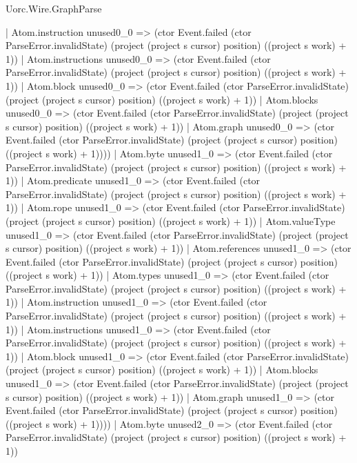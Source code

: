 \begin{lexlean}{Uorc.Wire.GraphParse}
\begin{semanticmodule}
{                  | Atom.instruction unused0_0 => (ctor Event.failed (ctor ParseError.invalidState) (project (project s cursor) position) ((project s work) + 1))
                  | Atom.instructions unused0_0 => (ctor Event.failed (ctor ParseError.invalidState) (project (project s cursor) position) ((project s work) + 1))
                  | Atom.block unused0_0 => (ctor Event.failed (ctor ParseError.invalidState) (project (project s cursor) position) ((project s work) + 1))
                  | Atom.blocks unused0_0 => (ctor Event.failed (ctor ParseError.invalidState) (project (project s cursor) position) ((project s work) + 1))
                  | Atom.graph unused0_0 => (ctor Event.failed (ctor ParseError.invalidState) (project (project s cursor) position) ((project s work) + 1))))
              | Atom.byte unused1_0 => (ctor Event.failed (ctor ParseError.invalidState) (project (project s cursor) position) ((project s work) + 1))
              | Atom.predicate unused1_0 => (ctor Event.failed (ctor ParseError.invalidState) (project (project s cursor) position) ((project s work) + 1))
              | Atom.rope unused1_0 => (ctor Event.failed (ctor ParseError.invalidState) (project (project s cursor) position) ((project s work) + 1))
              | Atom.valueType unused1_0 => (ctor Event.failed (ctor ParseError.invalidState) (project (project s cursor) position) ((project s work) + 1))
              | Atom.references unused1_0 => (ctor Event.failed (ctor ParseError.invalidState) (project (project s cursor) position) ((project s work) + 1))
              | Atom.types unused1_0 => (ctor Event.failed (ctor ParseError.invalidState) (project (project s cursor) position) ((project s work) + 1))
              | Atom.instruction unused1_0 => (ctor Event.failed (ctor ParseError.invalidState) (project (project s cursor) position) ((project s work) + 1))
              | Atom.instructions unused1_0 => (ctor Event.failed (ctor ParseError.invalidState) (project (project s cursor) position) ((project s work) + 1))
              | Atom.block unused1_0 => (ctor Event.failed (ctor ParseError.invalidState) (project (project s cursor) position) ((project s work) + 1))
              | Atom.blocks unused1_0 => (ctor Event.failed (ctor ParseError.invalidState) (project (project s cursor) position) ((project s work) + 1))
              | Atom.graph unused1_0 => (ctor Event.failed (ctor ParseError.invalidState) (project (project s cursor) position) ((project s work) + 1))))
          | Atom.byte unused2_0 => (ctor Event.failed (ctor ParseError.invalidState) (project (project s cursor) position) ((project s work) + 1))
}
\end{semanticmodule}
\end{lexlean}
